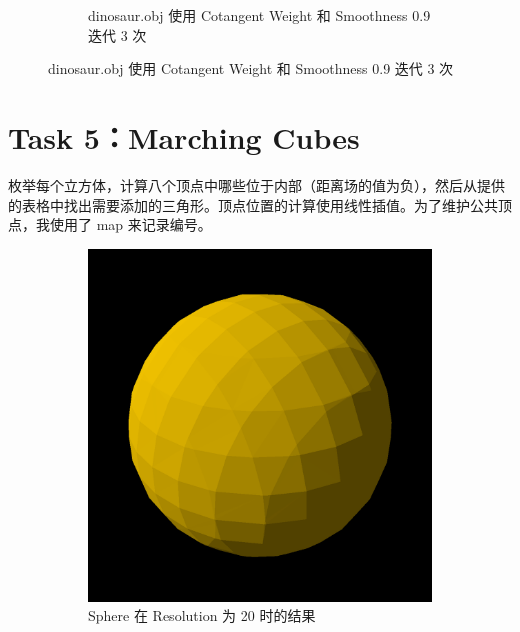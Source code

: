 \documentclass[UTF8]{ctexart}
\begin{document}
\begin{figure}[h]
\begin{subfigure}[b]{0.48\textwidth}
        \caption{dinosaur.obj 使用 Cotangent Weight 和 Smoothness 0.9 迭代 3 次}
    \end{subfigure}
\end{figure}

\section*{Task 5：Marching Cubes}

枚举每个立方体，计算八个顶点中哪些位于内部（距离场的值为负），然后从提供的表格中找出需要添加的三角形。顶点位置的计算使用线性插值。为了维护公共顶点，我使用了 map 来记录编号。


\begin{figure}[h]
    \begin{subfigure}[b]{0.48\textwidth}
        \centering
        \includegraphics[height=0.3\textheight]{images/5-1.png}
        \caption{Sphere 在 Resolution 为 20 时的结果}
    \end{subfigure}
    \hfill
    \begin{subfigure}[b]{0.48\textwidth}
        \centering

\end{subfigure}
\end{figure}
\end{document}
